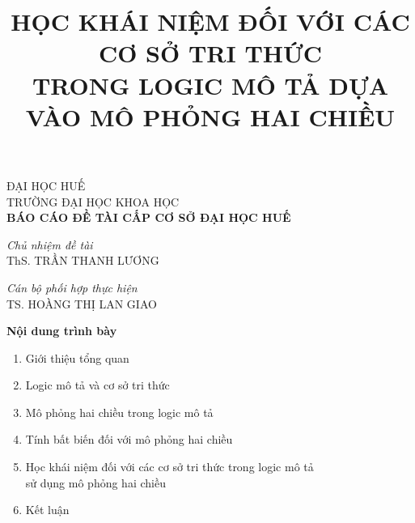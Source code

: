 \documentclass[notheorems,xcolor=dvipsnames]{beamer}
\title[Học khái niệm đối với các cơ sở tri thức \ldots]{\bf {\normalsize HỌC KHÁI NIỆM ĐỐI VỚI CÁC CƠ SỞ TRI THỨC\\ TRONG LOGIC MÔ TẢ DỰA VÀO MÔ PHỎNG HAI CHIỀU}}
\date{}
\begin{document}
\begin{frame}
	\begin{center}
		{\scriptsize ĐẠI HỌC HUẾ}\\
		{\scriptsize TRƯỜNG ĐẠI HỌC KHOA HỌC}\\[6ex]
		{\bf BÁO CÁO ĐỀ TÀI CẤP CƠ SỞ ĐẠI HỌC HUẾ}
	\end{center}
	\vspace{-3ex}
	\titlepage

	\begin{minipage}{0.4\textwidth}
		\begin{flushleft}
			\emph{\footnotesize Chủ nhiệm đề tài}\\
			{\scriptsize ThS. TRẦN THANH LƯƠNG}
		\end{flushleft}
	\end{minipage}
	\begin{minipage}{0.58\textwidth}
		\begin{flushright}
			\emph{\footnotesize Cán bộ phối hợp thực hiện} \\
			{\scriptsize TS. HOÀNG THỊ LAN GIAO}
		\end{flushright}
	\end{minipage}
\end{frame}

\begin{frame}{\bf Nội dung trình bày}
	\begin{enumerate}
		\setlength{\itemsep}{2.0ex}
		\item Giới thiệu tổng quan

		\item Logic mô tả và cơ sở tri thức

		\item Mô phỏng hai chiều trong logic mô tả 
  
		\item Tính bất biến đối với mô phỏng hai chiều

		\item Học khái niệm đối với các cơ sở tri thức trong logic mô tả\\ sử dụng mô phỏng hai chiều
		
		\item Kết luận
\end{enumerate}
\end{frame}
\end{document}
